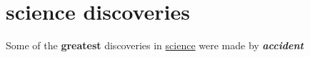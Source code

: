 \documentclass{article}
\begin{document}
	\section{science discoveries}
	Some of the \textbf{greatest} discoveries in \underline{science} were made by \textbf{\textit{accident}}
\end{document}
